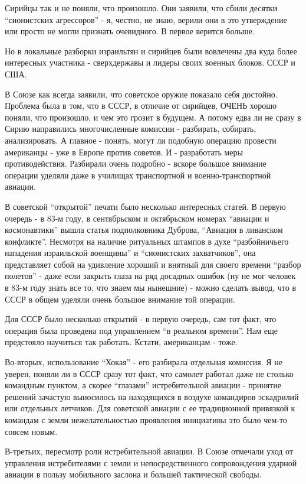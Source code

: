 Сирийцы так и не поняли, что произошло. Они заявили, что сбили десятки “сионистских агрессоров” - я, честно, не знаю, верили они в это утверждение или просто не могли признать очевидного. В первое верится больше.

Но в локальные разборки израильтян и сирийцев были вовлечены два куда более интересных участника - сверхдержавы и лидеры своих военных блоков. СССР и США.

В Союзе как всегда заявили, что советское оружие показало себя достойно. Проблема была в том, что в СССР, в отличие от сирийцев, ОЧЕНЬ хорошо поняли, что произошло, и чем это грозит в будущем. А потому едва ли не сразу в Сирию направились многочисленные комиссии - разбирать, собирать, анализировать. А главное - понять, могут ли подобную операцию провести американцы - уже в Европе против советов. И - разработать меры противодействия. Разбирали очень подробно - вскоре большое внимание операции уделяли даже в училищах транспортной и военно-транспортной авиации.

В советской “открытой” печати было несколько интересных статей. В первую очередь - в 83-м году, в сентябрьском и октябрьском номерах “авиации и космонавтики” вышла статья подполковника Дуброва, “Авиация в ливанском конфликте”. Несмотря на наличие ритуальных штампов в духе “разбойничьего нападения израильской военщины” и “сионистских захватчиков”, она представляет собой на удивление хороший и внятный для своего времени “разбор полетов” - даже если закрыть глаза на ряд досадных ошибок (ну не мог человек в 83-м году знать все то, что знаем мы нынешние) - можно сделать вывод, что в СССР в общем уделяли очень большое внимание той операции.

Для СССР было несколько открытий - в первую очередь, сам тот факт, что операция была проведена под управлением “в реальном времени”. Нам еще предстояло научиться так работать. Кстати, американцам - тоже.

Во-вторых, использование “Хокая” - его разбирала отдельная комиссия. Я не уверен, поняли ли в СССР сразу тот факт, что самолет работал даже не столько командным пунктом, а скорее “глазами” истребительной авиации - принятие решений зачастую выносилось на находящихся в воздухе командиров эскадрилий или отдельных летчиков. Для советской авиации с ее традиционной привязкой к командам с земли нежелательностью проявления инициативы это было чем-то совсем новым.

В-третьих, пересмотр роли истребительной авиации. В Союзе отмечали уход от управления истребителями с земли и непосредственного сопровождения ударной авиации в пользу мобильного заслона и большей тактической свободы.

